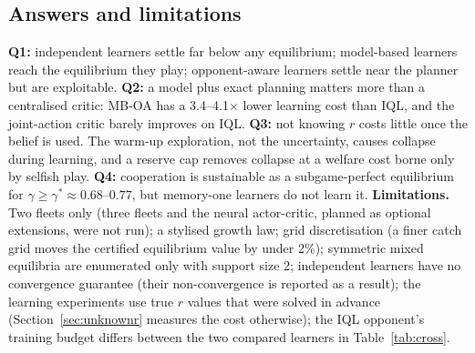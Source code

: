 \subsection{Answers and limitations}
\textbf{Q1:} independent learners settle far below any equilibrium; model-based learners reach the equilibrium they
play; opponent-aware learners settle near the planner but are exploitable. \textbf{Q2:} a model plus exact planning
matters more than a centralised critic: MB-OA has a 3.4--4.1$\times$ lower learning cost than IQL, and the joint-action
critic barely improves on IQL. \textbf{Q3:} not knowing $r$ costs little once the belief is used. The warm-up exploration,
not the uncertainty, causes collapse during learning, and a reserve cap removes collapse at a welfare cost borne only by
selfish play. \textbf{Q4:} cooperation is sustainable as a subgame-perfect equilibrium for $\gamma\ge\gamma^*\approx0.68$--$0.77$,
but memory-one learners do not learn it.
\textbf{Limitations.} Two fleets only (three fleets and the neural actor-critic, planned as optional extensions, were not run); a stylised growth law;
grid discretisation (a finer catch grid moves the certified equilibrium value by under 2\%); symmetric mixed equilibria
are enumerated only with support size 2; independent learners have no convergence guarantee (their non-convergence is
reported as a result); the learning experiments use true $r$ values that were solved in advance (Section~\ref{sec:unknownr}
measures the cost otherwise); the IQL opponent's training budget differs between the two compared learners in
Table~\ref{tab:cross}.
